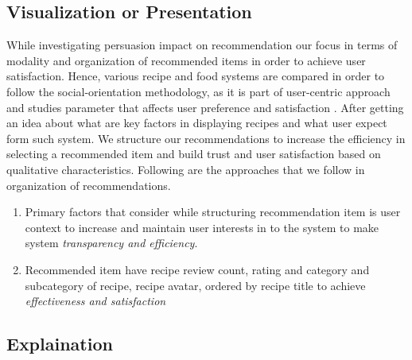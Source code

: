 \subsection{Visualization or Presentation} 

While investigating persuasion impact on recommendation our focus in terms of modality and organization of recommended items in order to achieve user satisfaction.  Hence, various recipe and food systems are compared in order to follow the social-orientation methodology, as it is part of user-centric approach and studies parameter that affects user preference and satisfaction \cite{ swearingen2002interaction}. After getting an idea about what are key factors in displaying recipes and what user expect form such system.  We structure our recommendations to increase the efficiency in selecting a recommended item and build trust and user satisfaction based on qualitative characteristics. Following are the approaches that we follow in organization of recommendations.

\begin{enumerate}
	\item Primary factors that consider while structuring recommendation item is user context to increase and maintain user interests in to the system to make system \textit{transparency and efficiency}. 
	
	\item Recommended item have recipe review count, rating and category and subcategory of recipe, recipe avatar, ordered by recipe title to achieve \textit{ effectiveness and satisfaction}
\end{enumerate}

\subsection{Explaination} \label{ch4_persuasion_explaination}

